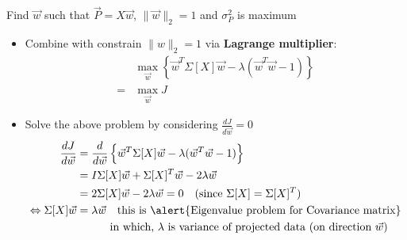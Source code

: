 \begin{frame}{Find $\vec{w}$ such that $\vec{P} = X\vec{w}$, $\|\vec{w}\|_2=1$ and $\sigma^2_{P}$ is maximum}
    \begin{itemize}
        \item Combine with constrain $\|w\|_2=1$ via \textbf{Lagrange multiplier}:
        \begin{align*}
                &\max_{\vec{w}}\left\{\vec{w}^T \Sigma[X] \vec{w} - \lambda(\vec{w}^T\vec{w} - 1)\right\}\\
                = &\max_{\vec{w}} J
            \end{align*}

        \item Solve the above problem by considering $\frac{dJ}{d\vec{w}}=0$
        \begin{align*}
            \frac{dJ}{d\vec{w}} &= \frac{d}{d\vec{w}} \left\{ \vec{w}^T \Sigma[X] \vec{w} - \lambda(\vec{w}^T\vec{w} - 1) \right\}\\
            &= I\Sigma[X] \vec{w} + \Sigma[X]^T \vec{w} - 2\lambda\vec{w}\\
            &= 2\Sigma[X]\vec{w} - 2\lambda\vec{w} = 0 \quad (\text{since } \Sigma[X] = \Sigma[X]^T)\\
            \Leftrightarrow \Sigma[X]\vec{w} &= \lambda\vec{w} \quad \text{this is \alert{Eigenvalue problem for Covariance matrix}}\\
            &\quad\quad\quad \text{in which, $\lambda$ is variance of projected data (on direction $\vec{w}$)}
        \end{align*}
    \end{itemize}
\end{frame}

